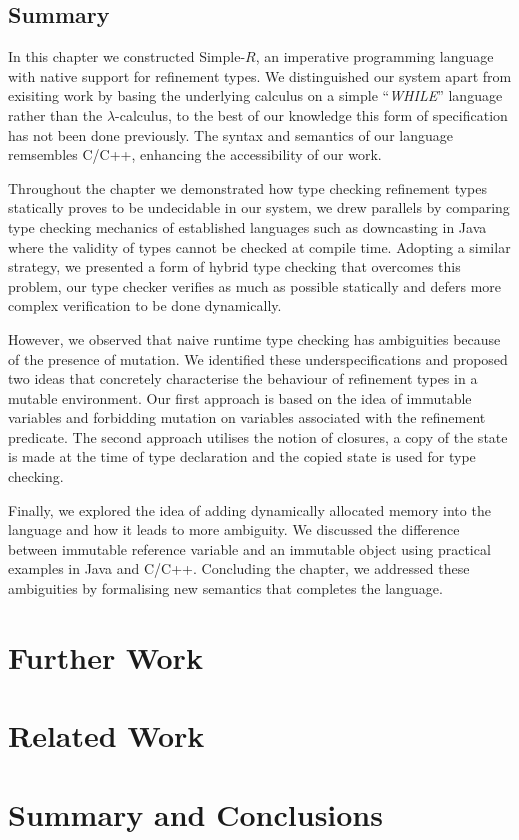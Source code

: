 \documentclass[a4paper,12pt]{report}
\begin{document}
\section{Summary}
In this chapter we constructed Simple-$R$, an imperative programming language with native 
support for refinement types. We distinguished our 
system apart from exisiting work by basing the underlying calculus 
on a simple ``\textit{WHILE}'' language 
rather than the $\lambda$-calculus, to the best of our knowledge this form of 
specification has not been done previously. The syntax and semantics of our 
language remsembles C/C++, enhancing the accessibility of our work.

\par
Throughout the chapter we demonstrated how type checking refinement types 
statically proves to be undecidable in our system, we drew parallels by comparing 
type checking mechanics of established languages such as downcasting in Java 
where the validity of types cannot be checked at compile time. 
Adopting a similar strategy, we presented a form of hybrid type checking 
that overcomes this problem, our type checker verifies as much as possible 
statically and defers more complex verification to be done dynamically. 

\par
However, we observed that naive runtime type checking has ambiguities 
because of the presence of mutation. We identified these underspecifications and 
proposed two ideas that concretely characterise the behaviour of refinement 
types in a mutable environment. Our first approach is based on the 
idea of immutable variables and forbidding mutation on variables associated 
with the refinement predicate. The second approach utilises the notion of closures, 
a copy of the state is made at the time of type declaration and the copied 
state is used for type checking. 

\par
Finally, we explored the idea of adding dynamically allocated memory into the 
language and how it leads to more ambiguity. We discussed the difference between 
immutable reference variable and an immutable object using practical examples in 
Java and C/C++. Concluding the chapter, we addressed these ambiguities by 
formalising new semantics that completes the language.


\chapter{Further Work}

\chapter{Related Work}

\chapter{Summary and Conclusions} 


\appendix
\singlespacing

\printbibliography
\end{document}
